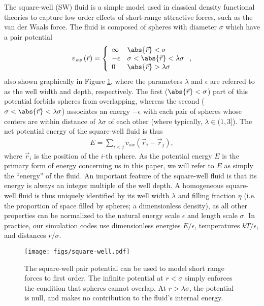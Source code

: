 \documentclass[11pt]{article}
\newcommand{\p}[1]{\left(#1\right)} %
\begin{document}
The square-well (SW) fluid is a simple model used in classical density
functional theories to capture low order effects of short-range
attractive forces, such as the van der Waals force. The fluid is
composed of spheres with diameter $\sigma$ which have a pair potential
\begin{align}
  v_{sw}\p{\vec r}=\left\{
    \begin{array}{ll}
      \infty & \abs{\vec r}<\sigma \\
      -\epsilon & \sigma<\abs{\vec r}<\lambda\sigma \\
      0 & \abs{\vec r}>\lambda\sigma
    \end{array}
  \right., \label{eq:pair_potential}
\end{align}
also shown graphically in Figure \ref{fig:pair_potential}, where the
parameters $\lambda$ and $\epsilon$ are referred to as the well width
and depth, respectively. The first ($\abs{\vec r}<\sigma$) part of
this potential forbids spheres from overlapping, whereas the second
($\sigma<\abs{\vec r}<\lambda\sigma$) associates an energy $-\epsilon$
with each pair of spheres whose centers are within distance of
$\lambda\sigma$ of each other (where typically, $\lambda\in(1,3]$).
The net potential energy of the square-well fluid is thus
\begin{align}
  E=\sum_{i<j}v_{sw}\p{\vec r_i-\vec r_j},
  \label{eq:internal_energy}
\end{align}
where $\vec r_i$ is the position of the $i$-th sphere. As the
potential energy $E$ is the primary form of energy concerning us in
this paper, we will refer to $E$ as simply the ``energy'' of the
fluid. An important feature of the square-well fluid is that its
energy is always an integer multiple of the well depth. A homogeneous
square-well fluid is thus uniquely identified by its well width
$\lambda$ and filling fraction $\eta$ (i.e. the proportion of space
filled by spheres; a dimensionless density), as all other properties
can be normalized to the natural energy scale $\epsilon$ and length
scale $\sigma$. In practice, our simulation codes use dimensionless
energies $E/\epsilon$, temperatures $kT/\epsilon$, and distances
$r/\sigma$.

\begin{figure}[!b]
  \centering
  \texttt{[image: figs/square-well.pdf]}
  \caption[The square-well pair potential]
  {The square-well pair potential can be used to model short range
    forces to first order. The infinite potential at $r<\sigma$ simply
    enforces the condition that spheres cannot overlap. At
    $r>\lambda\sigma$, the potential is null, and makes no
    contribution to the fluid's internal energy.}
  \label{fig:pair_potential}
\end{figure}
\end{document}
